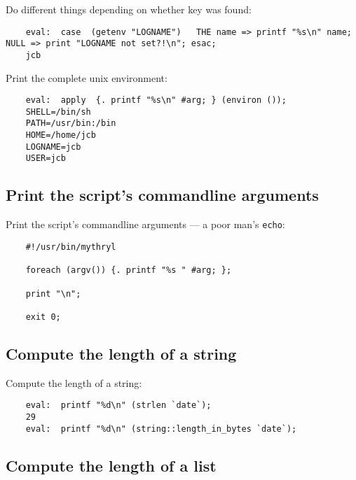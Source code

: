Do different things depending on whether 
key was found:
\begin{verbatim}
    eval:  case  (getenv "LOGNAME")   THE name => printf "%s\n" name; NULL => print "LOGNAME not set?!\n"; esac;
    jcb
\end{verbatim}

Print the complete unix environment:
\begin{verbatim}
    eval:  apply  {. printf "%s\n" #arg; } (environ ());
    SHELL=/bin/sh
    PATH=/usr/bin:/bin
    HOME=/home/jcb
    LOGNAME=jcb
    USER=jcb
\end{verbatim}

\cutend*

\subsection{Print the script's commandline arguments}

Print the script's commandline arguments 
--- a poor man's {\tt echo}:
\begin{verbatim}
    #!/usr/bin/mythryl

    foreach (argv()) {. printf "%s " #arg; };

    print "\n";

    exit 0;
\end{verbatim}

\cutend*

\subsection{Compute the length of a string}

Compute the length of a string:
\begin{verbatim}
    eval:  printf "%d\n" (strlen `date`);
    29
    eval:  printf "%d\n" (string::length_in_bytes `date`);
\end{verbatim}

\cutend*

\subsection{Compute the length of a list}

